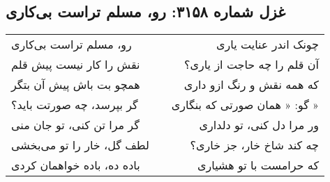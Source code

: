 \begin{center}
\section*{غزل شماره ۳۱۵۸: رو، مسلم تراست بی‌کاری}
\label{sec:3158}
\begin{longtable}{l p{0.5cm} r}
رو، مسلم تراست بی‌کاری
&&
چونک اندر عنایت یاری
\\
نقش را کار نیست پیش قلم
&&
آن قلم را چه حاجت از یاری؟
\\
همچو بت باش پیش آن بتگر
&&
که همه نقش و رنگ ازو داری
\\
گر بپرسد، چه صورتت باید؟
&&
گو: « همان صورتی که بنگاری »
\\
گر مرا تن کنی، تو جان منی
&&
ور مرا دل کنی، تو دلداری
\\
لطف گل، خار را تو می‌بخشی
&&
چه کند شاخ خار، جز خاری؟
\\
باده ده، باده خواهمان کردی
&&
که حرامست با تو هشیاری
\\
\end{longtable}
\end{center}
